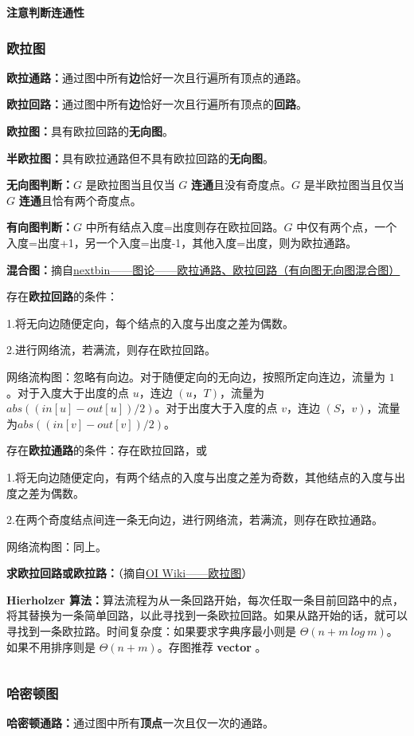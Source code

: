 \documentclass[a4paper,11pt]{article}
\begin{document}
\textbf{注意判断连通性}
\subsubsection{欧拉图}
\textbf{欧拉通路：}通过图中所有\textbf{边}恰好一次且行遍所有顶点的通路。

\textbf{欧拉回路：}通过图中所有\textbf{边}恰好一次且行遍所有顶点的\textbf{回路}。

\textbf{欧拉图：}具有欧拉回路的\textbf{无向图}。

\textbf{半欧拉图：}具有欧拉通路但不具有欧拉回路的\textbf{无向图}。

\textbf{无向图判断：}\(G\) 是欧拉图当且仅当 \(G\)
\textbf{连通}且没有奇度点。\(G\) 是半欧拉图当且仅当 \(G\)
\textbf{连通}且恰有两个奇度点。

\textbf{有向图判断：}\(G\) 中所有结点入度=出度则存在欧拉回路。\(G\)
中仅有两个点，一个入度=出度+1，另一个入度=出度-1，其他入度=出度，则为欧拉通路。

\textbf{混合图：}摘自\href{https://www.cnblogs.com/nextbin/p/4005396.html}{nextbin------图论------欧拉通路、欧拉回路（有向图无向图混合图）}

存在\textbf{欧拉回路}的条件：

1.将无向边随便定向，每个结点的入度与出度之差为偶数。

2.进行网络流，若满流，则存在欧拉回路。

网络流构图：忽略有向边。对于随便定向的无向边，按照所定向连边，流量为
\(1\) 。对于入度大于出度的点 \(u\)，连边 \((u，T)\)，流量为
\(abs((in[u]-out[u])/2)\)。对于出度大于入度的点 \(v\)，连边
\((S，v)\)，流量为\(abs( (in[v]-out[v])/2 )\)。

存在\textbf{欧拉通路}的条件：存在欧拉回路，或

1.将无向边随便定向，有两个结点的入度与出度之差为奇数，其他结点的入度与出度之差为偶数。

2.在两个奇度结点间连一条无向边，进行网络流，若满流，则存在欧拉通路。

网络流构图：同上。

\textbf{求欧拉回路或欧拉路：}（摘自\href{https://oi-wiki.org/graph/euler/}{OI
Wiki------欧拉图}）

\textbf{Hierholzer
算法：}算法流程为从一条回路开始，每次任取一条目前回路中的点，将其替换为一条简单回路，以此寻找到一条欧拉回路。如果从路开始的话，就可以寻找到一条欧拉路。时间复杂度：如果要求字典序最小则是
\(\Theta(n+m\ log\ m)\)。如果不用排序则是 \(\Theta(n+m)\)。存图推荐
\textbf{vector} 。
\inputminted[linenos]{c++}{graph/oulatu.cpp}
\subsubsection{哈密顿图}
\textbf{哈密顿通路：}通过图中所有\textbf{顶点}一次且仅一次的通路。
\end{document}
